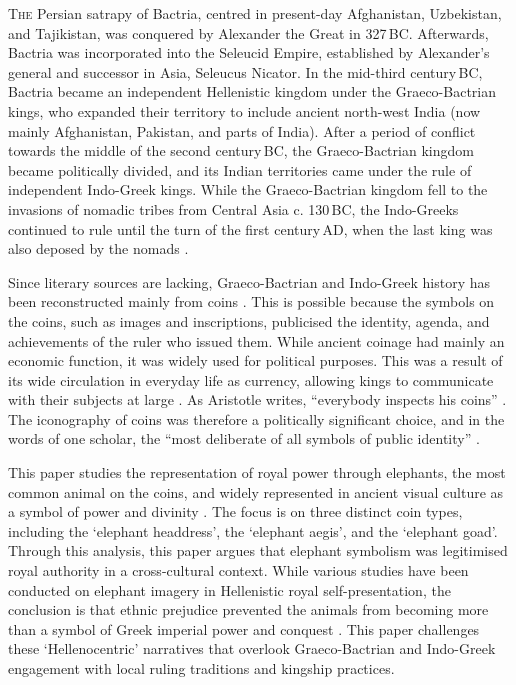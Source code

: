 \documentclass{ijsra}
\renewcommand\AD{{\,AD\xspace}}
\renewcommand\BC{{\,BC\xspace}}
\begin{document}
\IJSRAopening%

\lettrine{T}{he} Persian satrapy of Bactria, centred in present-day Afghanistan, Uzbekistan, and Tajikistan,
was conquered by Alexander the Great in 327\BC.
Afterwards, Bactria was incorporated into the Seleucid Empire, established by Alexander’s general and successor in Asia,
Seleucus Nicator.
In the mid-third century\BC, Bactria became an independent Hellenistic kingdom under the Graeco-Bactrian kings, 
who expanded their territory to include ancient north-west India (now mainly Afghanistan, Pakistan,
and parts of India).
After a period of conflict towards the middle of the second century\BC, the Graeco-Bactrian kingdom became politically divided,
and its Indian territories came under the rule of independent Indo-Greek kings.
While the Graeco-Bactrian kingdom fell to the invasions of nomadic tribes from Central Asia c. 130\BC,
the Indo-Greeks continued to rule until the turn of the first century\AD, when the last king was also deposed by the nomads
\parencites[47--50]{Bopearachchi2011}[3]{Mairs2014}. 

Since literary sources are lacking, Graeco-Bactrian and Indo-Greek history has been reconstructed mainly from coins \parencite[96--97]{Thonemann2015}.
This is possible because the symbols on the coins, such as images and inscriptions, publicised the identity, agenda, and achievements of the ruler who issued them.
While ancient coinage had mainly an economic function, it was widely used for political purposes. This was a result of its wide circulation in everyday life as currency, allowing kings to communicate with their subjects at large \parencite[11,61]{Howgego1995}.
As Aristotle writes, “everybody inspects his coins” \parencites[]{Arist. HA. 491a}[120]{Holt1999}.
The iconography of coins was therefore a politically significant choice, and in the words of one scholar, the “most deliberate of all symbols of public identity” \parencite[66]{Thonemann2015}.

This paper studies the representation of royal power through elephants, the most common animal on the coins, and widely represented in ancient visual culture as a symbol of power and divinity \parencites[383--384]{Bopearachchi1991}[11--19]{Gupta1983}[156]{Iossif2010}.
The focus is on three distinct coin types, including the ‘elephant headdress’, the ‘elephant aegis’, and the ‘elephant goad’. Through this analysis, this paper argues that elephant symbolism was legitimised royal authority in a cross-cultural context.  While various studies have been conducted on elephant imagery in Hellenistic royal self-presentation, the conclusion is that ethnic prejudice prevented the animals from becoming more than a symbol of Greek imperial power and conquest \parencites[263--264]{Alonso2013}[69]{Alonso2014}.
This paper challenges these ‘Hellenocentric’ narratives that overlook Graeco-Bactrian and Indo-Greek engagement with local ruling traditions and kingship practices.
\end{document}
